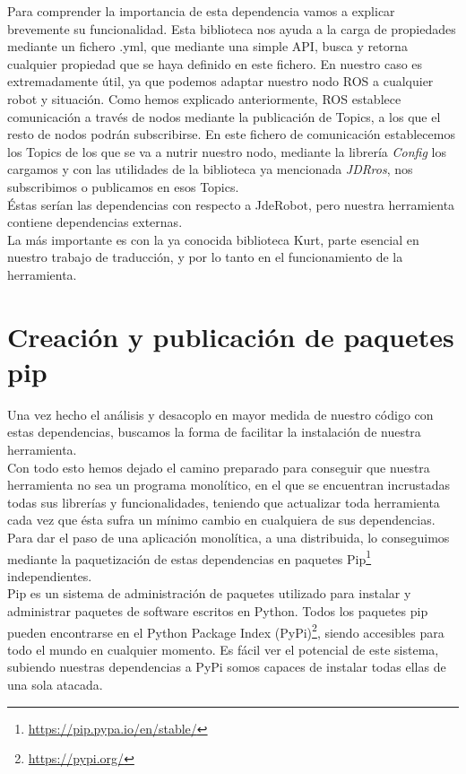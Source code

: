 Para comprender la importancia de esta dependencia vamos a explicar brevemente su funcionalidad. Esta biblioteca nos ayuda a la carga de propiedades mediante un fichero .yml, que mediante una simple API, busca y retorna cualquier propiedad que se haya definido en este fichero. En nuestro caso es extremadamente útil, ya que podemos adaptar nuestro nodo ROS a cualquier robot y situación. Como hemos explicado anteriormente, ROS establece comunicación a través de nodos mediante la publicación de Topics, a los que el resto de nodos podrán subscribirse. En este fichero de comunicación establecemos los Topics de los que se va a nutrir nuestro nodo, mediante la librería \textit{Config} los cargamos y con las utilidades de la biblioteca ya mencionada \textit{JDRros}, nos subscribimos o publicamos en esos Topics.\\

Éstas serían las dependencias con respecto a JdeRobot, pero nuestra herramienta contiene dependencias externas.\\

La más importante es con la ya conocida biblioteca Kurt, parte esencial en nuestro trabajo de traducción, y por lo tanto en el funcionamiento de la herramienta.

\section{Creación y publicación de paquetes pip}
\label{sec:pip}
Una vez hecho el análisis y desacoplo en mayor medida de nuestro código con estas dependencias, buscamos la forma de facilitar la instalación de nuestra herramienta.\\

Con todo esto hemos dejado el camino preparado para conseguir que nuestra herramienta no sea un programa monolítico, en el que se encuentran incrustadas todas sus librerías y funcionalidades, teniendo que actualizar toda herramienta cada vez que ésta sufra un mínimo cambio en cualquiera de sus dependencias. \\

Para dar el paso de una aplicación monolítica, a una distribuida, lo conseguimos mediante la paquetización de estas dependencias en paquetes Pip\footnote{\url{https://pip.pypa.io/en/stable/}} independientes.\\

Pip es un sistema de administración de paquetes utilizado para instalar y administrar paquetes de software escritos en Python. Todos los paquetes pip pueden encontrarse en el Python Package Index (PyPi)\footnote{\url{https://pypi.org/}}, siendo accesibles para todo el mundo en cualquier momento. Es fácil ver el potencial de este sistema, subiendo nuestras dependencias a PyPi somos capaces de instalar todas ellas de una sola atacada.\\

